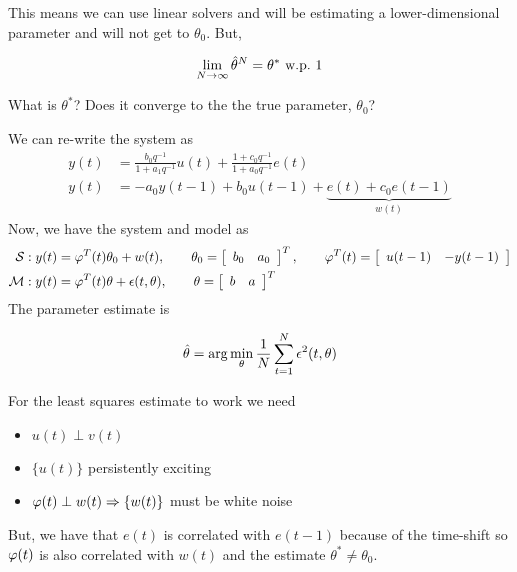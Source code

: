 \begin{example}
This means we can use linear solvers and will be estimating a lower-dimensional parameter and will not get to $\theta_0$.
But,

\begin{equation*}
\lim_{N\to\infty}\hat{\theta}^N= \theta^\ast\text{~w.p.~} 1
\end{equation*}

What is $\theta^\ast$? Does it converge to the the true parameter, $\theta_0$?

We can re-write the system as
\begin{align*}
y(t) &= \frac{b_0q^{-1}}{1+a_1q^{-1}}u(t) + \frac{1+c_0q^{-1}}{1+a_0q^{-1}}e(t) \\
y(t) &= -a_0y(t-1) + b_0u(t-1) + \underbrace{e(t) + c_0e(t-1)}_{w(t)}
\end{align*}
Now, we have the system and model as
\begin{align*}
\mathcal{S}: y(t) &= \varphi^T(t)\theta_0+w(t), \qquad \theta_0=\left[\begin{array}{c c} b_0 & a_0 \end{array}\right]^T, \qquad \varphi^T (t) = \left[\begin{array}{c c} u(t-1) & -y(t-1) \end{array}\right] \\
\mathcal{M}: y (t) &= \varphi^T (t)\theta+\epsilon(t,\theta), \qquad \theta=\left[\begin{array}{c c} b & a\end{array}\right]^T
\end{align*}
The parameter estimate is

\begin{equation*}
\hat{\theta} = \arg\min_\theta\frac{1}{N}\sum_{t=1}^N\epsilon^2(t,\theta)
\end{equation*}

For the least squares estimate to work we need
\begin{itemize}
\item $u(t)\perp v(t)$
\item $\{u(t)\}$ persistently exciting
\item $\varphi(t)\perp w(t) \Rightarrow \{w(t)\}$ must be white noise
\end{itemize}
But, we have that $e(t)$ is correlated with $e(t-1)$ because of the time-shift so $\varphi(t)$ is also correlated with $w(t)$ and the estimate $\theta^\ast\neq\theta_0$.


\end{example}
